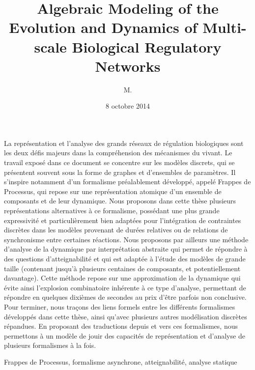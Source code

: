 \documentclass[12pt,french]{these-LUNAM}  %
\title{Algebraic Modeling of the Evolution and Dynamics of Multi-scale
  Biological Regulatory Networks}
\subtitle{\TODO}
\author{M.}{Maxime}{Folschette}
\date{8 octobre 2014}
\theoremstyle{definition}
\theoremstyle{remark}
\begin{document}
\begin{resume}
  \scriptsize
  La représentation et l'analyse des grands réseaux de régulation biologiques
  sont les deux défis majeurs dans la compréhension des mécanismes du vivant.
  Le travail exposé dans ce document se concentre sur les modèles discrets,
  qui se présentent souvent sous la forme de graphes et d'ensembles de paramètres.
  Il s'inspire notamment d'un formalisme préalablement développé,
  appelé Frappes de Processus,
  qui repose sur une représentation atomique d'un ensemble de composants et de leur dynamique.
  Nous proposons dans cette thèse plusieurs représentations alternatives à
  ce formalisme, possédant une plus grande expressivité
  et particulièrement bien adaptées pour l'intégration
  de contraintes discrètes dans les modèles
  provenant de durées relatives ou de relations de synchronisme entre certaines réactions.
  Nous proposons par ailleurs
  une méthode d'analyse de la dynamique par interprétation abstraite
  qui permet de répondre à des questions d'atteignabilité
  et qui est adaptée à l'étude des modèles de grande taille
  (contenant jusqu'à plusieurs centaines de composants, et potentiellement davantage).
  Cette méthode repose sur une approximation de la dynamique qui évite ainsi
  l'explosion combinatoire inhérente à ce type d'analyse,
  permettant de répondre en quelques dixièmes de secondes au prix d'être parfois non conclusive.
  Pour terminer, nous traçons des liens formels entre
  les différents formalismes développés dans cette
  thèse, ainsi qu'avec plusieurs autres modélisation discrètes répandues.
  En proposant des traductions depuis et vers ces formalismes,
  nous permettons à un modèle de jouir des capacités de représentation et d'analyse
  de plusieurs formalismes à la fois.
\end{resume}

\begin{motscles}
  Frappes de Processus,
  formalisme asynchrone,
  atteignabilité,
  analyse statique
\end{motscles}
\end{document}
